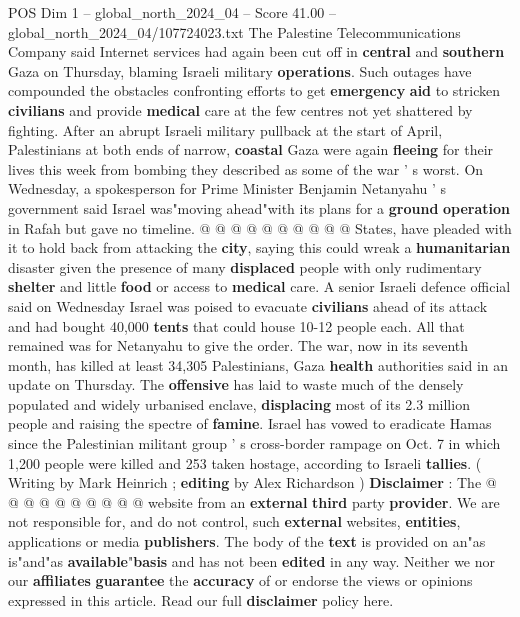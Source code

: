 \begin{textsample}{POS Dim 1 – global\_north\_2024\_04 – Score 41.00 – global\_north\_2024\_04/107724023.txt}
The Palestine Telecommunications Company said Internet services had again been cut off in \textbf{central} and \textbf{southern} Gaza on Thursday, blaming Israeli military \textbf{operations}.
Such outages have compounded the obstacles confronting efforts to get \textbf{emergency} \textbf{aid} to stricken \textbf{civilians} and provide \textbf{medical} care at the few centres not yet shattered by fighting.
After an abrupt Israeli military pullback at the start of April, Palestinians at both ends of narrow, \textbf{coastal} Gaza were again \textbf{fleeing} for their lives this week from bombing they described as some of the war ' s worst.
On Wednesday, a spokesperson for Prime Minister Benjamin Netanyahu ' s government said Israel was"moving ahead"with its plans for a \textbf{ground} \textbf{operation} in Rafah but gave no timeline. @ @ @ @ @ @ @ @ @ @ States, have pleaded with it to hold back from attacking the \textbf{city}, saying this could wreak a \textbf{humanitarian} disaster given the presence of many \textbf{displaced} people with only rudimentary \textbf{shelter} and little \textbf{food} or access to \textbf{medical} care.
A senior Israeli defence official said on Wednesday Israel was poised to evacuate \textbf{civilians} ahead of its attack and had bought 40,000 \textbf{tents} that could house 10-12 people each.
All that remained was for Netanyahu to give the order.
The war, now in its seventh month, has killed at least 34,305 Palestinians, Gaza \textbf{health} authorities said in an update on Thursday.
The \textbf{offensive} has laid to waste much of the densely populated and widely urbanised enclave, \textbf{displacing} most of its 2.3 million people and raising the spectre of \textbf{famine}.
Israel has vowed to eradicate Hamas since the Palestinian militant group ' s cross-border rampage on Oct. 7 in which 1,200 people were killed and 253 taken hostage, according to Israeli \textbf{tallies}. ( Writing by Mark Heinrich ; \textbf{editing} by Alex Richardson ) \textbf{Disclaimer} : The @ @ @ @ @ @ @ @ @ @ website from an \textbf{external} \textbf{third} party \textbf{provider}.
We are not responsible for, and do not control, such \textbf{external} websites, \textbf{entities}, applications or media \textbf{publishers}.
The body of the \textbf{text} is provided on an"as is"and"as \textbf{available}"\textbf{basis} and has not been \textbf{edited} in any way.
Neither we nor our \textbf{affiliates} \textbf{guarantee} the \textbf{accuracy} of or endorse the views or opinions expressed in this article.
Read our full \textbf{disclaimer} policy here.

\end{textsample}
